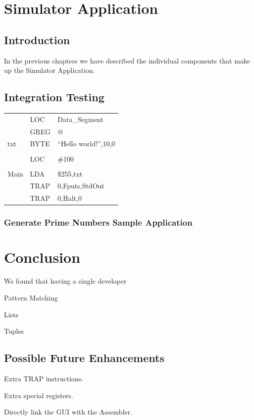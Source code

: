 \documentclass[a4paper,11pt]{report}
\begin{document}
\chapter{Simulator Application}
\section{Introduction}
In the previous chapters we have described the individual components that make up the Simulator Application.
\section{Integration Testing}
\begin{centering}
\begin{tabular}{ l l l }
 & LOC & Data\_Segment\\
 & GREG & @\\
txt & BYTE & ``Hello world!'',10,0\\
\\
 & LOC & \#100\\
\\
Main & LDA & \$255,txt\\
 & TRAP & 0,Fputs,StdOut\\
 & TRAP & 0,Halt,0\\
\end{tabular}
\end{centering}
\subsection{Generate Prime Numbers Sample Application}
\label{primenumbers}
\chapter*{Conclusion}
We found that having a single developer 

Pattern Matching

Lists

Tuples

\section*{Possible Future Enhancements}
Extra TRAP instructions.

Extra special registers.

Directly link the GUI with the Assembler.
\end{document}
